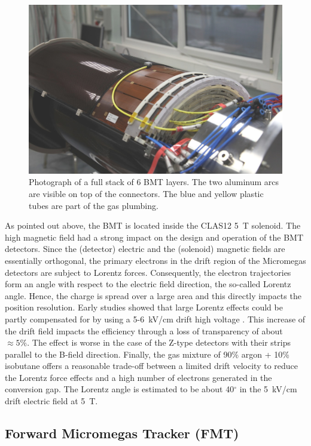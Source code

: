 \begin{figure}[htb]
 \includegraphics[width=1.0\columnwidth,keepaspectratio]{images/fig5}
 \caption{Photograph of a full stack of 6 BMT layers. The two aluminum arcs are visible on top of the connectors. The blue
   and yellow plastic tubes are part of the gas plumbing.}
 \label{fig:mm-fig4}
\end{figure}

As pointed out above, the BMT is located inside the CLAS12 5~T solenoid. The high magnetic field had a strong impact on
the design and operation of the BMT detectors. Since the (detector) electric and the (solenoid) magnetic fields are
essentially orthogonal, the primary electrons in the drift region of the Micromegas detectors are subject to Lorentz
forces. Consequently, the electron trajectories form an angle with respect to the electric field direction, the so-called
Lorentz angle. Hence, the charge is spread over a large area and this directly impacts the position resolution. Early studies
showed that large Lorentz effects could be partly compensated for by using a 5-6~kV/cm drift high voltage
\cite{KONCZYKOWSKI2010274}. This increase of the drift field impacts the efficiency through a loss of transparency of
about \(\approx5\%\). The effect is worse in the case of the Z-type detectors with their strips parallel to the B-field
direction. Finally, the gas mixture of 90\% argon + 10\% isobutane offers a reasonable trade-off between a limited drift
velocity to reduce the Lorentz force effects and a high number of electrons generated in the conversion gap. The Lorentz
angle is estimated to be about 40$^\circ$ in the 5~kV/cm drift electric field at 5~T.

\subsection{Forward Micromegas Tracker (FMT)}

